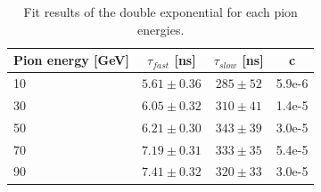 \documentclass[12pt]{article}
\begin{document}
\begin{table}[htb!]
  \centering
  \caption{Fit results of the double exponential for each pion energies.}
  \label{table:expotime_pions}
  \begin{tabular}{@{} lccc @{}}
    \toprule
    Pion energy [GeV] & $\tau_{fast}$ [ns] & $\tau_{slow}$ [ns] & c \\
    \midrule
    10 & $5.61 \pm 0.36$ & $285 \pm 52$ & 5.9e-6 \\
    \midrule
    30 & $6.05 \pm 0.32$ & $310 \pm 41$ & 1.4e-5 \\
    \midrule
    50 & $6.21 \pm 0.30$ & $343 \pm 39$ & 3.0e-5 \\
    \midrule
    70 & $7.19 \pm 0.31$ & $333 \pm 35$ & 5.4e-5 \\
    \midrule
    90 & $7.41 \pm 0.32$ & $320 \pm 33$ & 3.0e-5 \\
    \bottomrule
  \end{tabular}
\end{table}
\end{document}
